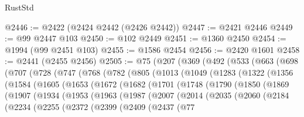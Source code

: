 \begin{lexlean}{RustStd}
\begin{coremodule}
@2446 := @2422 (@2424 @2442 (@2426 @2442))
@2447 := @2421 @2446
@2449 := @99 @2447 @103
@2450 := @102 @2449
@2451 := @1360 @2450
@2454 := @1994 (@99 @2451 @103)
@2455 := @1586 @2454
@2456 := @2420 @1601
@2458 := @2441 (@2455 @2456)
@2505 := @75
    (@207
      (@369
        (@492
          (@533
            (@663
              (@698
                (@707
                  (@728
                    (@747
                      (@768
                        (@782
                          (@805
                            (@1013
                              (@1049
                                (@1283
                                  (@1322
                                    (@1356
                                      (@1584
                                        (@1605
                                          (@1653
                                            (@1672
                                              (@1682
                                                (@1701
                                                  (@1748
                                                    (@1790
                                                      (@1850
                                                        (@1869
                                                          (@1907
                                                            (@1934
                                                              (@1953
                                                                (@1963
                                                                  (@1987
                                                                    (@2007
                                                                      (@2014
                                                                        (@2035
                                                                          (@2060
                                                                            (@2184
                                                                              (@2234
                                                                                (@2255
                                                                                  (@2372
                                                                                    (@2399
                                                                                      (@2409
                                                                                        (@2437
                                                                                          (@77

\end{coremodule}
\end{lexlean}

